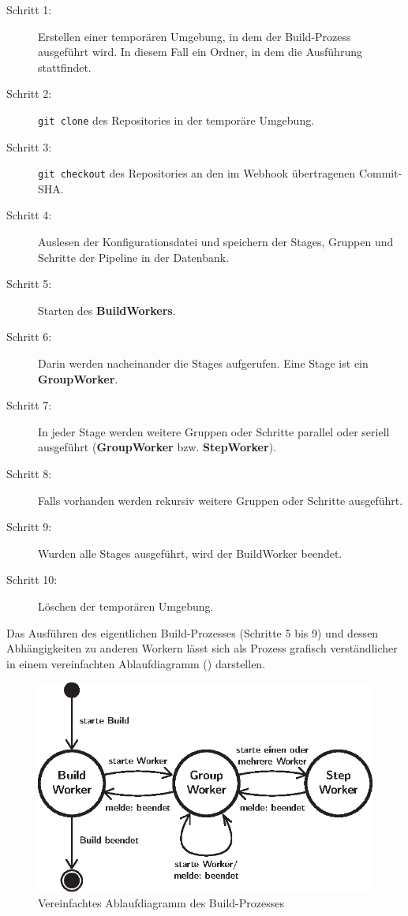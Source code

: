 \begin{description}
  \item[Schritt 1:] Erstellen einer temporären Umgebung, in dem der Build-Prozess ausgeführt wird. In diesem Fall ein Ordner, in dem die Ausführung stattfindet.
  \item[Schritt 2:] \texttt{git clone} des Repositories in der temporäre Umgebung.
  \item[Schritt 3:] \texttt{git checkout} des Repositories an den im Webhook übertragenen Commit-SHA.
  \item[Schritt 4:] Auslesen der Konfigurationsdatei und speichern der Stages, Gruppen und Schritte der Pipeline in der Datenbank.
  \item[Schritt 5:] Starten des \textbf{BuildWorkers}.
  \item[Schritt 6:] Darin werden nacheinander die Stages aufgerufen. Eine Stage ist ein \textbf{GroupWorker}.
  \item[Schritt 7:] In jeder Stage werden weitere Gruppen oder Schritte parallel oder seriell ausgeführt (\textbf{GroupWorker} bzw. \textbf{StepWorker}).
  \item[Schritt 8:] Falls vorhanden werden rekursiv weitere Gruppen oder Schritte ausgeführt.
  \item[Schritt 9:] Wurden alle Stages ausgeführt, wird der BuildWorker beendet.
  \item[Schritt 10:] Löschen der temporären Umgebung.
\end{description}

Das Ausführen des eigentlichen Build-Prozesses (Schritte 5 bis 9) und dessen Abhängigkeiten zu anderen Workern lässt sich als Prozess grafisch verständlicher in einem vereinfachten Ablaufdiagramm () darstellen.

\begin{figure}[h]
  \caption{Vereinfachtes Ablaufdiagramm des Build-Prozesses}
  \label{fig:ablauf-build-prozess}
  \centering
    \includegraphics[width=.7\textwidth]{assets/worker_diagram}
\end{figure}

